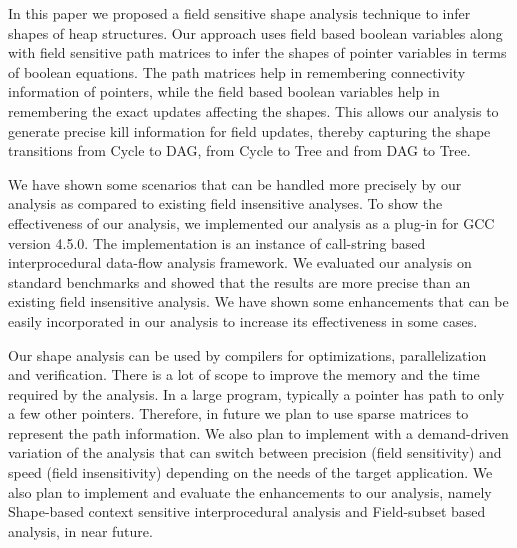 In this  paper we proposed  a field sensitive  shape analysis
technique to  infer shapes of heap  structures.  Our approach
uses field based boolean variables along with field sensitive
path  matrices to infer  the shapes  of pointer  variables in
terms  of  boolean  equations.   The path  matrices  help  in
remembering connectivity  information of pointers,  while the
field based  boolean variables help in  remembering the exact
updates affecting  the shapes.   This allows our  analysis to
generate precise kill  information for field updates, thereby
capturing the shape transitions from Cycle to DAG, from Cycle
to Tree  and from  DAG to Tree. 

We  have  shown  some  scenarios  that can  be  handled  more
precisely  by  our analysis  as  compared  to existing  field
insensitive  analyses.   To  show  the effectiveness  of  our
analysis,  we implemented our  analysis as  a plug-in  for GCC
version  4.5.0.    The  implementation  is   an  instance  of
call-string    based   interprocedural    data-flow   analysis
framework.  We evaluated  our analysis on standard benchmarks
and showed that the results are more precise than an existing
field insensitive analysis.   We have shown some enhancements
that can  be easily incorporated in our  analysis to increase
its effectiveness in some cases.

Our   shape   analysis  can   be   used   by  compilers   for
optimizations, parallelization and  verification.  There is a
lot of scope  to improve the memory and  the time required by
the  analysis. In a  large program,  typically a  pointer has
path to only  a few other pointers.  Therefore,  in future we
plan   to  use   sparse  matrices   to  represent   the  path
information.  We also plan  to implement with a demand-driven
variation of  the analysis that can  switch between precision
(field sensitivity) and speed (field insensitivity) depending
on  the needs  of the  target  application. We  also plan  to
implement  and  evaluate the  enhancements  to our  analysis,
namely Shape-based context sensitive interprocedural analysis   
and Field-subset based analysis, in near future.
